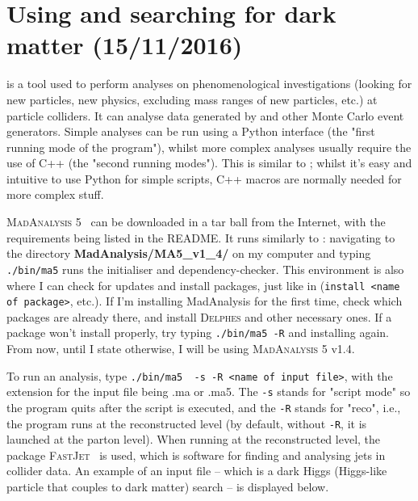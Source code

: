 
\chapter{Using \madanalysis and searching for dark matter (15/11/2016)}

\madanalysis is a tool used to perform analyses on phenomenological investigations (looking for new particles, new physics, excluding mass ranges of new particles, etc.) at particle colliders. It can analyse data generated by \madgraph and other Monte Carlo event generators. Simple analyses can be run using a Python interface (the "first running mode of the program"), whilst more complex analyses usually require the use of C++ (the "second running modes"). This is similar to \ROOT; whilst it's easy and intuitive to use Python for simple scripts, C++ macros are normally needed for more complex stuff.

\textsc{MadAnalysis 5}~\cite{Conte:2012madanalysis} can be downloaded in a tar ball from the Internet, with the requirements being listed in the README. It runs similarly to \madgraph: navigating to the directory \textbf{MadAnalysis/MA5\_v1\_4/} on my computer and typing \verb!./bin/ma5! runs the initialiser and dependency-checker. This environment is also where I can check for updates and install packages, just like in \madgraph (\verb!install <name of package>!, etc.). If I'm installing MadAnalysis for the first time, check which packages are already there, and install \textsc{Delphes} and other necessary ones. If a package won't install properly, try typing \verb!./bin/ma5 -R! and installing again. From now, until I state otherwise, I will be using \textsc{MadAnalysis 5} v1.4.

To run an analysis, type \verb!./bin/ma5  -s -R <name of input file>!, with the extension for the input file being .ma or .ma5. The \verb!-s! stands for "script mode" so the program quits after the script is executed, and the \verb!-R! stands for "reco", i.e., the program runs at the reconstructed level (by default, without \verb!-R!, it is launched at the parton level). When running at the reconstructed level, the package \textsc{FastJet}~\cite{Cacciari:2011fastjet} is used, which is software for finding and analysing jets in collider data. An example of an input file -- which is a dark Higgs (Higgs-like particle that couples to dark matter) search -- is displayed below.



